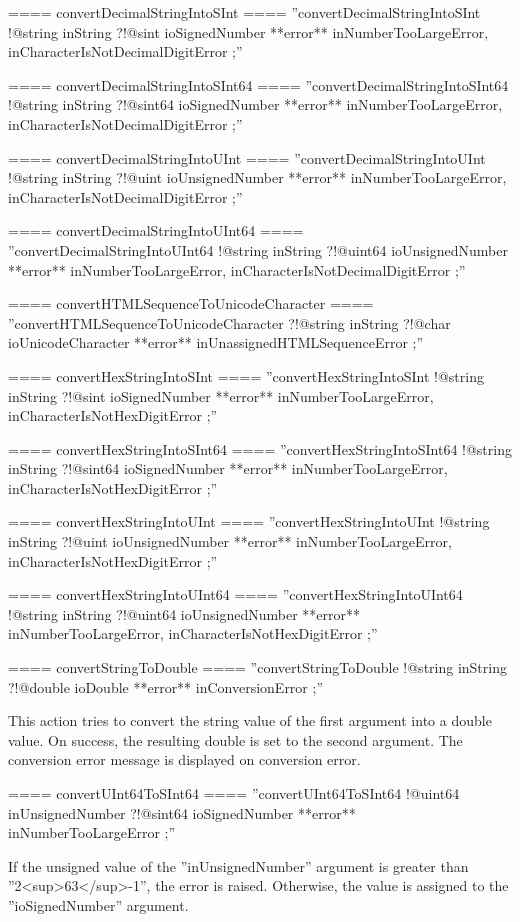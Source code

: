 {==== convertDecimalStringIntoSInt ====
''convertDecimalStringIntoSInt !@string inString ?!@sint ioSignedNumber **error** inNumberTooLargeError, inCharacterIsNotDecimalDigitError ;''

==== convertDecimalStringIntoSInt64 ====
''convertDecimalStringIntoSInt64 !@string inString ?!@sint64 ioSignedNumber **error** inNumberTooLargeError, inCharacterIsNotDecimalDigitError ;''

==== convertDecimalStringIntoUInt ====
''convertDecimalStringIntoUInt !@string inString ?!@uint ioUnsignedNumber **error** inNumberTooLargeError, inCharacterIsNotDecimalDigitError ;''

==== convertDecimalStringIntoUInt64 ====
''convertDecimalStringIntoUInt64 !@string inString ?!@uint64 ioUnsignedNumber **error** inNumberTooLargeError, inCharacterIsNotDecimalDigitError ;''

==== convertHTMLSequenceToUnicodeCharacter ====
''convertHTMLSequenceToUnicodeCharacter ?!@string inString ?!@char ioUnicodeCharacter **error** inUnassignedHTMLSequenceError ;''

==== convertHexStringIntoSInt ====
''convertHexStringIntoSInt !@string inString ?!@sint ioSignedNumber **error** inNumberTooLargeError, inCharacterIsNotHexDigitError ;''

==== convertHexStringIntoSInt64 ====
''convertHexStringIntoSInt64 !@string inString ?!@sint64 ioSignedNumber **error** inNumberTooLargeError, inCharacterIsNotHexDigitError ;''

==== convertHexStringIntoUInt ====
''convertHexStringIntoUInt !@string inString ?!@uint ioUnsignedNumber **error** inNumberTooLargeError, inCharacterIsNotHexDigitError ;''

==== convertHexStringIntoUInt64 ====
''convertHexStringIntoUInt64 !@string inString ?!@uint64 ioUnsignedNumber **error** inNumberTooLargeError, inCharacterIsNotHexDigitError ;''

==== convertStringToDouble ====
''convertStringToDouble !@string inString ?!@double ioDouble **error** inConversionError ;''

This action tries to convert the string value of the first argument into a double value. On success, the resulting double is set to the second argument. The conversion error message is displayed on conversion error.

==== convertUInt64ToSInt64 ====
''convertUInt64ToSInt64 !@uint64 inUnsignedNumber ?!@sint64 ioSignedNumber **error** inNumberTooLargeError ;''

If the unsigned value of the ''inUnsignedNumber'' argument is greater than ''2<sup>63</sup>-1'', the error is raised. Otherwise, the value is assigned to the ''ioSignedNumber'' argument.

}
